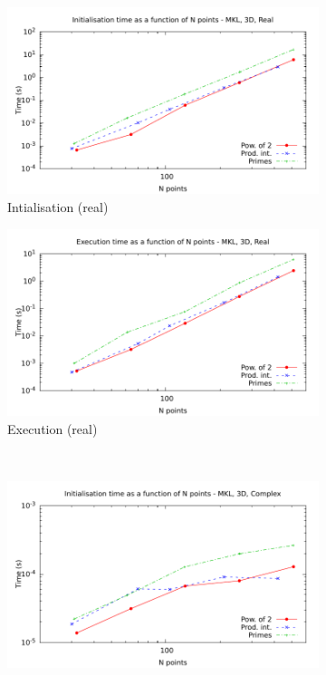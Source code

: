 \documentclass[12pt, a4paper]{article}
\begin{document}
\begin{figure}[H]
\captionsetup{width=0.8\linewidth}
\centering
\begin{subfigure}{.5\textwidth}
\centering
\includegraphics[width=.9\linewidth]{graphs/3d-mkl-init-r.pdf}
\caption{Intialisation (real)}
\label{3DMKLRI}
\end{subfigure}%
\begin{subfigure}{.5\textwidth}
\centering
\includegraphics[width=.9\linewidth]{graphs/3d-mkl-exec-r.pdf}
\caption{Execution (real)}
\label{3DMKLR}
\end{subfigure}\\
\begin{subfigure}{.5\textwidth}
\centering
\includegraphics[width=.9\linewidth]{graphs/3d-mkl-init-c.pdf}

\end{subfigure}
\end{figure}
\end{document}
